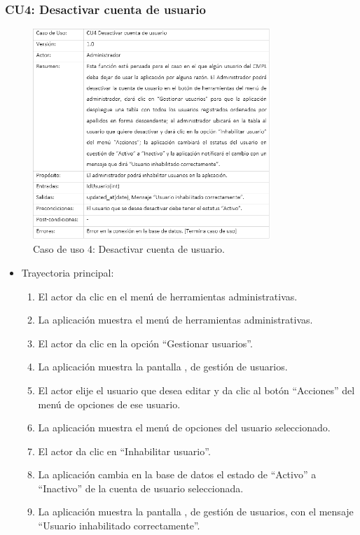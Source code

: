 		\subsubsection{CU4: Desactivar cuenta de usuario}
			\begin{figure}[htbp!]
				\centering
					\includegraphics[width=0.8\textwidth]{images/CU/CU4}
					\caption{Caso de uso 4: Desactivar cuenta de usuario.}
				\label{Tabla}
			\end{figure}
			
			\begin{itemize}
				\item Trayectoria principal:
					\begin{enumerate}
						\item El actor da clic en el menú de herramientas administrativas.
						\item La aplicación muestra el menú de herramientas administrativas.
						\item El actor da clic en la opción ``Gestionar usuarios''.
						\item La aplicación muestra la pantalla , de gestión de usuarios.
						\item El actor elije el usuario que desea editar y da clic al botón ``Acciones'' del menú de opciones de ese usuario.
						\item La aplicación muestra el menú de opciones del usuario seleccionado.
						\item El actor da clic en ``Inhabilitar usuario''.
						\item La aplicación cambia en la base de datos el estado de ``Activo'' a ``Inactivo'' de la cuenta de usuario seleccionada.
						\item La aplicación muestra la pantalla , de gestión de usuarios, con el mensaje ``Usuario inhabilitado correctamente''.
					\end{enumerate}
			\end{itemize}
			
